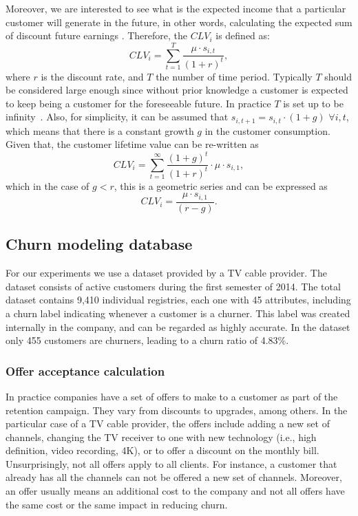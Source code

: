 Moreover, we are interested to see what is the expected income that a particular customer will 
generate in the future, in other words, calculating the expected sum of 
discount future earnings \citep{Neslin2006}. Therefore, the $CLV_i$ is defined as:
\begin{equation}
	CLV_i = \sum_{t=1}^T\frac{\mu \cdot s_{i,t}}{(1+r)^t},
\end{equation}
where $r$ is the discount rate, and $T$ the number of time period.
Typically $T$ should be considered large enough since without prior 
knowledge a customer is expected to keep being a customer for the foreseeable future. In practice 
$T$ is set up to be infinity~\citep{Glady2009}. Also, for simplicity, it can be assumed that 
$s_{i,t+1}=s_{i,t}\cdot (1+g)$ $\forall {i,t}$, which means that there is a constant growth $g$ in 
the customer consumption. Given that, the customer lifetime value can be re-written as
\begin{equation}
 CLV_i = \sum_{t=1}^\infty\frac{ (1+g)^t}{(1+r)^t}\cdot \mu\cdot s_{i,1},
\end{equation}
which in the case of $g<r$, this is a geometric series and can be expressed as
\begin{equation}
 CLV_i = \frac{\mu\cdot s_{i,1}}{(r-g)}.
\end{equation}


\subsection{Churn modeling database}
\label{sec:5:1:data}

For our experiments we use a dataset provided by a TV cable provider. 
The dataset consists of active customers during the first semester of 2014. 	
The total dataset contains 9,410 individual registries, each one with 45 attributes, 
including a churn label indicating whenever a customer is a churner.
This label was created internally in the company, and can be regarded as highly accurate. 
In the dataset only 455 customers are churners, leading to a churn ratio of 4.83\%.
	
\subsubsection{Offer acceptance calculation}

In practice companies have a set of offers to make to a customer as part of the retention 
campaign. They vary from discounts to upgrades, among others. In the particular case of a TV cable 
provider, the offers include adding a new set of channels, changing the TV receiver to one with new 
technology (i.e., high definition, video recording, 4K),  or to offer a discount on the monthly 
bill. Unsurprisingly, not all offers apply to all clients. For instance, a customer that already 
has all  the channels can not be offered a new set of channels. Moreover, an offer usually means an 
additional cost to the company and not all offers have the same cost or the same impact in 
reducing churn.

